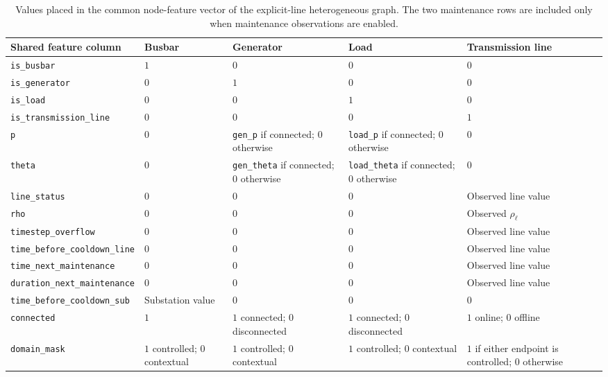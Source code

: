 \begin{table}[H]
  \centering
  \scriptsize
  \caption{Values placed in the common node-feature vector of the
  explicit-line heterogeneous graph. The two maintenance rows are included
  only when maintenance observations are enabled.}
  \label{tab:heterogeneous-line-node-features}
  \setlength{\tabcolsep}{3pt}
  \begin{tabular}{L{0.30\textwidth}L{0.10\textwidth}L{0.14\textwidth}L{0.14\textwidth}L{0.20\textwidth}}
    \toprule
    Shared feature column & Busbar & Generator & Load & Transmission line \\
    \midrule
    \texttt{is\_busbar} & $1$ & $0$ & $0$ & $0$ \\
    \texttt{is\_generator} & $0$ & $1$ & $0$ & $0$ \\
    \texttt{is\_load} & $0$ & $0$ & $1$ & $0$ \\
    \texttt{is\_transmission\_line} & $0$ & $0$ & $0$ & $1$ \\
    \texttt{p} & $0$ & \texttt{gen\_p} if connected; $0$ otherwise & \texttt{load\_p} if connected; $0$ otherwise & $0$ \\
    \texttt{theta} & $0$ & \texttt{gen\_theta} if connected; $0$ otherwise & \texttt{load\_theta} if connected; $0$ otherwise & $0$ \\
    \texttt{line\_status} & $0$ & $0$ & $0$ & Observed line value \\
    \texttt{rho} & $0$ & $0$ & $0$ & Observed $\rho_\ell$ \\
    \texttt{timestep\_overflow} & $0$ & $0$ & $0$ & Observed line value \\
    \texttt{time\_before\_cooldown\_line} & $0$ & $0$ & $0$ & Observed line value \\
    \texttt{time\_next\_maintenance} & $0$ & $0$ & $0$ & Observed line value \\
    \texttt{duration\_next\_maintenance} & $0$ & $0$ & $0$ & Observed line value \\
    \texttt{time\_before\_cooldown\_sub} & Substation value & $0$ & $0$ & $0$ \\
    \texttt{connected} & $1$ & $1$ connected; $0$ disconnected & $1$ connected; $0$ disconnected & $1$ online; $0$ offline \\
    \texttt{domain\_mask} & $1$ controlled; $0$ contextual & $1$ controlled; $0$ contextual & $1$ controlled; $0$ contextual & $1$ if either endpoint is controlled; $0$ otherwise \\
    \bottomrule
  \end{tabular}
\end{table}

